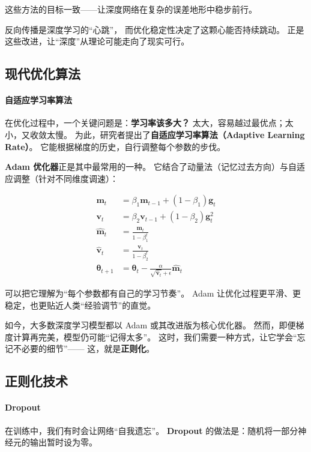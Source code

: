 这些方法的目标一致——让深度网络在复杂的误差地形中稳步前行。

反向传播是深度学习的“心跳”，  
而优化稳定性决定了这颗心能否持续跳动。  
正是这些改进，让“深度”从理论可能走向了现实可行。

\subsection{现代优化算法}

\paragraph{自适应学习率算法}  
在优化过程中，一个关键问题是：\textbf{学习率该多大？}  
太大，容易越过最优点；太小，又收敛太慢。  
为此，研究者提出了\textbf{自适应学习率算法（Adaptive Learning Rate）}。  
它能根据梯度的历史，自行调整每个参数的步伐。  

\textbf{Adam 优化器}正是其中最常用的一种。  
它结合了动量法（记忆过去方向）与自适应调整（针对不同维度调速）：  

\begin{align}
\mathbf{m}_t &= \beta_1 \mathbf{m}_{t-1} + (1-\beta_1) \mathbf{g}_t \\
\mathbf{v}_t &= \beta_2 \mathbf{v}_{t-1} + (1-\beta_2) \mathbf{g}_t^2 \\
\hat{\mathbf{m}}_t &= \frac{\mathbf{m}_t}{1-\beta_1^t} \\
\hat{\mathbf{v}}_t &= \frac{\mathbf{v}_t}{1-\beta_2^t} \\
\boldsymbol{\theta}_{t+1} &= \boldsymbol{\theta}_t - \frac{\alpha}{\sqrt{\hat{\mathbf{v}}_t} + \epsilon} \hat{\mathbf{m}}_t
\end{align}

可以把它理解为“每个参数都有自己的学习节奏”。  
Adam 让优化过程更平滑、更稳定，也更贴近人类“经验调节”的直觉。

如今，大多数深度学习模型都以 Adam 或其改进版为核心优化器。  
然而，即便梯度计算再完美，模型仍可能“记得太多”。  
这时，我们需要一种方式，让它学会“忘记不必要的细节”——  
这，就是\textbf{正则化}。

\subsection{正则化技术}

\paragraph{Dropout}  
在训练中，我们有时会让网络“自我遗忘”。  
\textbf{Dropout} 的做法是：随机将一部分神经元的输出暂时设为零。  

